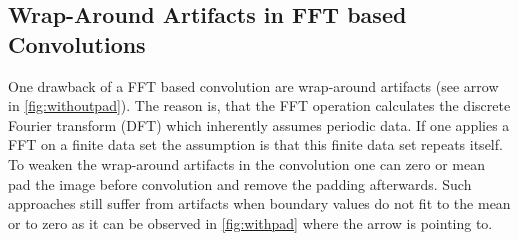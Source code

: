 \documentclass{juliacon}
\begin{document}
\subsection{Wrap-Around Artifacts in FFT based Convolutions}
    One drawback of a FFT based convolution are wrap-around artifacts (see arrow in \autoref{fig:withoutpad}). The reason is, that the FFT operation calculates the discrete
    Fourier transform (DFT) which inherently assumes periodic data. If one applies a FFT on a finite data set the assumption is that
    this finite data set repeats itself. 
    To weaken the wrap-around artifacts in the convolution one can zero or mean pad the image before convolution 
    and remove the padding afterwards. Such approaches still suffer from artifacts when boundary values do not fit
    to the mean or to zero as it can be observed in \autoref{fig:withpad} where the arrow is pointing to.
\end{document}
